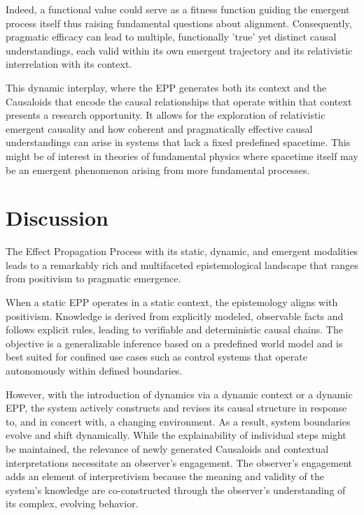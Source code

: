 \documentclass{article}
\begin{document}
Indeed, a functional value could serve as a fitness function guiding the emergent process itself thus raising fundamental questions about alignment. Consequently, pragmatic efficacy can lead to multiple, functionally 'true' yet distinct causal understandings, each valid within its own emergent trajectory and its relativistic interrelation with its context.

This dynamic interplay, where the EPP generates both its context and the Causaloids that encode the causal relationships that operate within that context presents a research opportunity.
It allows for the exploration of relativistic emergent causality and how coherent and pragmatically effective causal understandings can arise in systems that lack a fixed predefined spacetime. This might be of interest in theories of fundamental physics where spacetime itself may be an emergent phenomenon arising from more fundamental processes.


\section{Discussion}
\label{sec:Discussion}

The Effect Propagation Process with its static, dynamic, and emergent modalities leads to a remarkably rich and multifaceted epistemological landscape that ranges from positivism to pragmatic emergence.

When a static EPP operates in a static context, the epistemology aligns with positivism. Knowledge is derived from explicitly modeled, observable facts and follows explicit rules, leading to verifiable and deterministic causal chains. The objective is a generalizable inference based on a predefined world model and is best suited for confined use cases such as control systems that operate autonomously within defined boundaries.

However, with the introduction of dynamics via a dynamic context or a dynamic EPP, the system actively constructs and revises its causal structure in response to, and in concert with, a changing environment. As a result, system boundaries evolve and shift dynamically. While the explainability of individual steps might be maintained, the relevance of newly generated Causaloids and contextual interpretations necessitate an observer's engagement.
The observer's engagement adds an element of interpretivism because the meaning and validity of the system's knowledge are co-constructed through the observer's understanding of its complex, evolving behavior.
\end{document}

